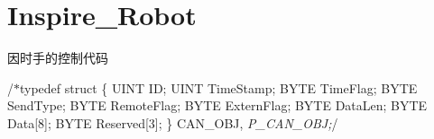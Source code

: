 \chapter{Inspire\+\_\+\+Robot}
\hypertarget{md__r_e_a_d_m_e}{}\label{md__r_e_a_d_m_e}
\label{md__r_e_a_d_m_e_autotoc_md0}%
%
 因时手的控制代码

/\texorpdfstring{$\ast$}{*}typedef struct  \{ UINT ID; UINT Time\+Stamp; BYTE Time\+Flag; BYTE Send\+Type; BYTE Remote\+Flag; BYTE Extern\+Flag; BYTE Data\+Len; BYTE Data\mbox{[}8\mbox{]}; BYTE Reserved\mbox{[}3\mbox{]}; \} CAN\+\_\+\+OBJ, {\itshape P\+\_\+\+CAN\+\_\+\+OBJ;}/ 